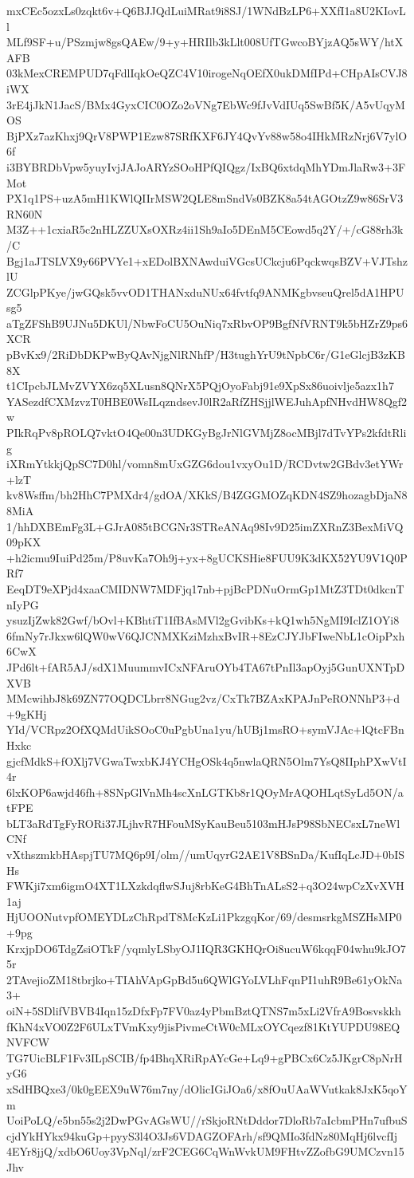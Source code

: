 mxCEc5ozxLs0zqkt6v+Q6BJJQdLuiMRat9i8SJ/1WNdBzLP6+XXfI1a8U2KIovLl
MLf9SF+u/PSzmjw8gsQAEw/9+y+HRIlb3kLlt008UfTGwcoBYjzAQ5sWY/htXAFB
03kMexCREMPUD7qFdlIqkOeQZC4V10irogeNqOEfX0ukDMfIPd+CHpAIsCVJ8iWX
3rE4jJkN1JacS/BMx4GyxCIC0OZo2oVNg7EbWc9fJvVdIUq5SwBf5K/A5vUqyMOS
BjPXz7azKhxj9QrV8PWP1Ezw87SRfKXF6JY4QvYv88w58o4IHkMRzNrj6V7ylO6f
i3BYBRDbVpw5yuyIvjJAJoARYzSOoHPfQIQgz/IxBQ6xtdqMhYDmJlaRw3+3FMot
PX1q1PS+uzA5mH1KWlQIIrMSW2QLE8mSndVs0BZK8a54tAGOtzZ9w86SrV3RN60N
M3Z++1cxiaR5c2nHLZZUXsOXRz4ii1Sh9aIo5DEnM5CEowd5q2Y/+/cG88rh3k/C
Bgj1aJTSLVX9y66PVYe1+xEDolBXNAwduiVGcsUCkcju6PqckwqsBZV+VJTshzlU
ZCGlpPKye/jwGQsk5vvOD1THANxduNUx64fvtfq9ANMKgbvseuQrel5dA1HPUsg5
aTgZFShB9UJNu5DKUl/NbwFoCU5OuNiq7xRbvOP9BgfNfVRNT9k5bHZrZ9ps6XCR
pBvKx9/2RiDbDKPwByQAvNjgNlRNhfP/H3tughYrU9tNpbC6r/G1eGlcjB3zKB8X
t1CIpcbJLMvZVYX6zq5XLusn8QNrX5PQjOyoFabj91e9XpSx86uoivlje5azx1h7
YASezdfCXMzvzT0HBE0WsILqzndsevJ0lR2aRfZHSjjlWEJuhApfNHvdHW8Qgf2w
PIkRqPv8pROLQ7vktO4Qe00n3UDKGyBgJrNlGVMjZ8ocMBjl7dTvYPs2kfdtRlig
iXRmYtkkjQpSC7D0hl/vomn8mUxGZG6dou1vxyOu1D/RCDvtw2GBdv3etYWr+lzT
kv8Wsffm/bh2HhC7PMXdr4/gdOA/XKkS/B4ZGGMOZqKDN4SZ9hozagbDjaN88MiA
1/hhDXBEmFg3L+GJrA085tBCGNr3STReANAq98Iv9D25imZXRnZ3BexMiVQ09pKX
+h2icmu9IuiPd25m/P8uvKa7Oh9j+yx+8gUCKSHie8FUU9K3dKX52YU9V1Q0PRf7
EeqDT9eXPjd4xaaCMIDNW7MDFjq17nb+pjBcPDNuOrmGp1MtZ3TDt0dkcnTnIyPG
ysuzIjZwk82Gwf/bOvl+KBhtiT1IfBAsMVl2gGvibKs+kQ1wh5NgMI9IclZ1OYi8
6fmNy7rJkxw6lQW0wV6QJCNMXKziMzhxBvIR+8EzCJYJbFIweNbL1cOipPxh6CwX
JPd6lt+fAR5AJ/sdX1MuummvICxNFAruOYb4TA67tPnIl3apOyj5GunUXNTpDXVB
MMcwihbJ8k69ZN77OQDCLbrr8NGug2vz/CxTk7BZAxKPAJnPeRONNhP3+d+9gKHj
YId/VCRpz2OfXQMdUikSOoC0uPgbUna1yu/hUBj1msRO+symVJAc+lQtcFBnHxkc
gjcfMdkS+fOXlj7VGwaTwxbKJ4YCHgOSk4q5nwlaQRN5Olm7YsQ8IIphPXwVtI4r
6lxKOP6awjd46fh+8SNpGlVnMh4scXnLGTKb8r1QOyMrAQOHLqtSyLd5ON/atFPE
bLT3aRdTgFyRORi37JLjhvR7HFouMSyKauBeu5103mHJsP98SbNECsxL7neWlCNf
vXthszmkbHAspjTU7MQ6p9I/olm//umUqyrG2AE1V8BSnDa/KufIqLcJD+0bISHs
FWKji7xm6igmO4XT1LXzkdqflwSJuj8rbKeG4BhTnALsS2+q3O24wpCzXvXVH1aj
HjUOONutvpfOMEYDLzChRpdT8McKzLi1PkzgqKor/69/desmsrkgMSZHsMP0+9pg
KrxjpDO6TdgZsiOTkF/yqmlyLSbyOJ1IQR3GKHQrOi8ucuW6kqqF04whu9kJO75r
2TAvejioZM18tbrjko+TIAhVApGpBd5u6QWlGYoLVLhFqnPI1uhR9Be61yOkNa3+
oiN+5SDlifVBVB4Iqn15zDfxFp7FV0az4yPbmBztQTNS7m5xLi2VfrA9Bosvskkh
fKhN4xVO0Z2F6ULxTVmKxy9jisPivmeCtW0cMLxOYCqezf81KtYUPDU98EQNVFCW
TG7UicBLF1Fv3ILpSCIB/fp4BhqXRiRpAYcGe+Lq9+gPBCx6Cz5JKgrC8pNrHyG6
xSdHBQxe3/0k0gEEX9uW76m7ny/dOlicIGiJOa6/x8fOuUAaWVutkak8JxK5qoYm
UoiPoLQ/e5bn55s2j2DwPGvAGsWU//rSkjoRNtDddor7DloRb7aIcbmPHn7ufbuS
cjdYkHYkx94kuGp+pyyS3l4O3Js6VDAGZOFArh/sf9QMIo3fdNz80MqHj6lvcfIj
4EYr8jjQ/xdbO6Uoy3VpNql/zrF2CEG6CqWnWvkUM9FHtvZZofbG9UMCzvn15Jhv
